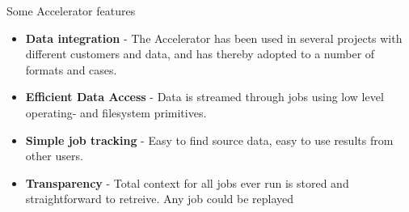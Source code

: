 \documentclass[a4paper]{report}
\begin{document}
Some Accelerator features
\begin{itemize}
\item \textbf{Data integration} - The Accelerator has been used in
  several projects with different customers and data, and has thereby
  adopted to a number of formats and cases.
\item \textbf{Efficient Data Access} - Data is streamed through jobs
  using low level operating- and filesystem primitives.
\item \textbf{Simple job tracking} - Easy to find source data, easy to
  use results from other users.
\item \textbf{Transparency} - Total context for all jobs ever run is
  stored and straightforward to retreive.  Any job could be replayed
\end{itemize}






  




  

\end{document}
